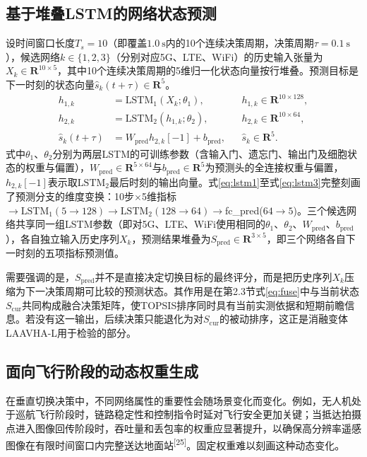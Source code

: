 \documentclass[10pt,a4paper]{ctexart}
\newcommand{\upcite}[1]{\textsuperscript{[#1]}}
\begin{document}
\subsection{基于堆叠LSTM的网络状态预测}

设时间窗口长度$T_s=10$（即覆盖$1.0~\mathrm{s}$内的10个连续决策周期，决策周期$\tau=0.1~\mathrm{s}$），候选网络$k\in\{1,2,3\}$（分别对应5G、LTE、WiFi）的历史输入张量为$X_k\in\mathbf{R}^{10\times5}$，其中10个连续决策周期的5维归一化状态向量按行堆叠。预测目标是下一时刻的状态向量$\hat{s}_k(t+\tau)\in\mathbf{R}^5$。
\begin{align}
h_{1,k} &= \mathrm{LSTM}_1(X_k;\theta_1), && h_{1,k}\in\mathbf{R}^{10\times128}, \label{eq:lstm1}\\
h_{2,k} &= \mathrm{LSTM}_2(h_{1,k};\theta_2), && h_{2,k}\in\mathbf{R}^{10\times64}, \label{eq:lstm2}\\
\hat{s}_k(t+\tau) &= W_{\mathrm{pred}}h_{2,k}[-1]+b_{\mathrm{pred}}, && \hat{s}_k\in\mathbf{R}^5. \label{eq:lstm3}
\end{align}
式中$\theta_1$、$\theta_2$分别为两层LSTM的可训练参数（含输入门、遗忘门、输出门及细胞状态的权重与偏置），$W_{\mathrm{pred}}\in\mathbf{R}^{5\times64}$与$b_{\mathrm{pred}}\in\mathbf{R}^5$为预测头的全连接权重与偏置，$h_{2,k}[-1]$表示取$\mathrm{LSTM}_2$最后时刻的输出向量。式\eqref{eq:lstm1}至式\eqref{eq:lstm3}完整刻画了预测分支的维度变换：10步$\times$5维指标$\rightarrow\mathrm{LSTM}_1(5\rightarrow128)\rightarrow\mathrm{LSTM}_2(128\rightarrow64)\rightarrow$fc\_pred($64\rightarrow5$)。三个候选网络共享同一组LSTM参数（即对5G、LTE、WiFi使用相同的$\theta_1$、$\theta_2$、$W_{\mathrm{pred}}$、$b_{\mathrm{pred}}$），各自独立输入历史序列$X_k$，预测结果堆叠为$S_{\mathrm{pred}}\in\mathbf{R}^{3\times5}$，即三个网络各自下一时刻的五项指标预测值。

需要强调的是，$S_{\mathrm{pred}}$并不是直接决定切换目标的最终评分，而是把历史序列$X_k$压缩为下一决策周期可比较的预测状态。其作用是在第2.3节式\eqref{eq:fuse}中与当前状态$S_{\mathrm{cur}}$共同构成融合决策矩阵，使TOPSIS排序同时具有当前实测依据和短期前瞻信息。若没有这一输出，后续决策只能退化为对$S_{\mathrm{cur}}$的被动排序，这正是消融变体LAAVHA-L用于检验的部分。

\subsection{面向飞行阶段的动态权重生成}

在垂直切换决策中，不同网络属性的重要性会随场景变化而变化。例如，无人机处于巡航飞行阶段时，链路稳定性和控制指令时延对飞行安全更加关键；当抵达拍摄点进入图像回传阶段时，吞吐量和丢包率的权重应显著提升，以确保高分辨率遥感图像在有限时间窗口内完整送达地面站\upcite{25}。固定权重难以刻画这种动态变化。
\end{document}

